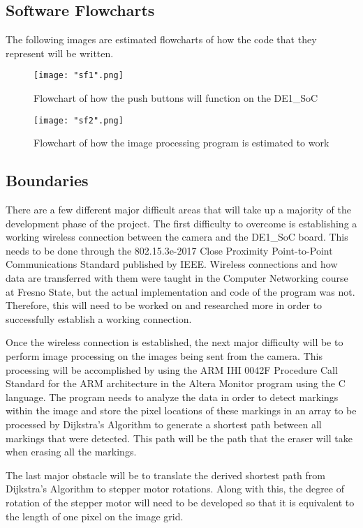 \subsection{Software Flowcharts}

The following images are estimated flowcharts of how the code that they represent will be written.

\begin{figure}[H]
	\centering
	{\texttt{[image: "sf1".png]}}
	\caption{ Flowchart of how the push buttons will function on the DE1\_SoC
		\cite{smdataR}}
	\label{fig:sf1}
\end{figure}

\begin{figure}[H]
	\centering
	{\texttt{[image: "sf2".png]}}
	\caption{ Flowchart of how the image processing program is estimated to work
		\cite{smdataR}}
	\label{fig:sf2}
\end{figure}

\subsection{Boundaries}


\setlength{\parindent}{2.5ex} There are a few different major difficult areas that will take up a majority of the development phase of the project. The first difficulty to overcome is establishing a working wireless connection between the camera and the DE1\_SoC board. This needs to be done through the 802.15.3e-2017 Close Proximity Point-to-Point Communications Standard published by IEEE. Wireless connections and how data are transferred with them were taught in the Computer Networking course at Fresno State, but the actual implementation and code of the program was not. Therefore, this will need to be worked on and researched more in order to successfully establish a working connection.\par
\setlength{\parindent}{2.5ex}
Once the wireless connection is established, the next major difficulty will be to perform image processing on the images being sent from the camera. This processing will be accomplished by using the ARM IHI 0042F Procedure Call Standard for the ARM architecture in the Altera Monitor program using the C language. The program needs to analyze the data in order to detect markings within the image and store the pixel locations of these markings in an array to be processed by Dijkstra's Algorithm to generate a shortest path between all markings that were detected. This path will be the path that the eraser will take when erasing all the markings.\par
\setlength{\parindent}{2.5ex}
The last major obstacle will be to translate the derived shortest path from Dijkstra's Algorithm to stepper motor rotations. Along with this, the degree of rotation of the stepper motor will need to be developed so that it is equivalent to the length of one pixel on the image grid. \\

